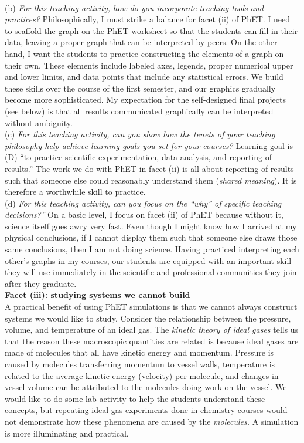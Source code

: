 \documentclass[../../../main.tex]{subfiles}
\begin{document}
\\
\vspace{0.25cm}
(b) \textit{For this teaching activity, how do you incorporate teaching tools and practices?} Philosophically, I must strike a balance for facet (ii) of PhET.  I need to scaffold the graph on the PhET worksheet so that the students can fill in their data, leaving a proper graph that can be interpreted by peers.  On the other hand, I want the students to practice constructing the elements of a graph on their own.  These elements include labeled axes, legends, proper numerical upper and lower limits, and data points that include any statistical errors.  We build these skills over the course of the first semester, and our graphics gradually become more sophisticated.  My expectation for the self-designed final projects (see below) is that all results communicated graphically can be interpreted without ambiguity. 
\\
\vspace{0.25cm}
(c) \textit{For this teaching activity, can you show how the tenets of your teaching philosophy help achieve learning goals you
set for your courses?} Learning goal is (D) ``to practice scientific experimentation, data analysis, and reporting of results.''  The work we do with PhET in facet (ii) is all about reporting of results such that someone else could reasonably understand them (\textit{shared meaning}).  It is therefore a worthwhile skill to practice.
\\
\vspace{0.25cm}
(d) \textit{For this teaching activity, can you focus on the ``why'' of specific teaching decisions?''}  On a basic level, I focus on facet (ii) of PhET because without it, science itself goes awry very fast.  Even though I might know how I arrived at my physical conclusions, if I cannot display them such that someone else draws those same conclusions, then I am not doing science.  Having practiced interpreting each other's graphs in my courses, our students are equipped with an important skill they will use immediately in the scientific and professional communities they join after they graduate.
\\
\vspace{0.25cm}
\textbf{Facet (iii): studying systems we cannot build}
\\
\vspace{0.25cm}
A practical benefit of using PhET simulations is that we cannot always construct systems we would like to study.  Consider the relationship between the pressure, volume, and temperature of an ideal gas.  The \textit{kinetic theory of ideal gases} tells us that the reason these macroscopic quantities are related is because ideal gases are made of molecules that all have kinetic energy and momentum.  Pressure is caused by molecules transferring momentum to vessel walls, temperature is related to the average kinetic energy (velocity) per molecule, and changes in vessel volume can be attributed to the molecules doing work on the vessel.  We would like to do some lab activity to help the students understand these concepts, but repeating ideal gas experiments done in chemistry courses would not demonstrate how these phenomena are caused by the \textit{molecules.}  A simulation is more illuminating and practical.
\end{document}
